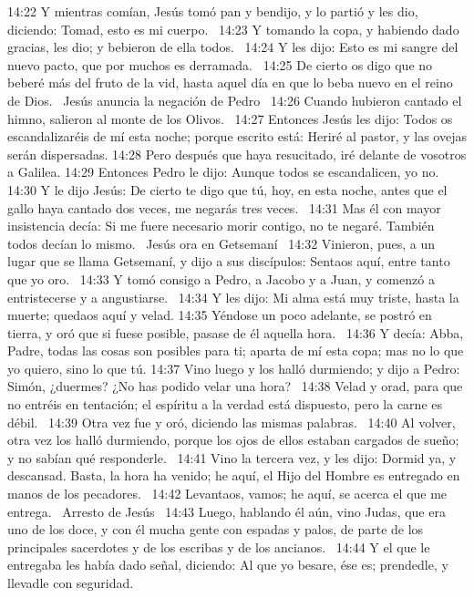 14:22 Y mientras comían, Jesús tomó pan y bendijo, y lo partió y les dio, diciendo: Tomad, esto es mi cuerpo.  
14:23 Y tomando la copa, y habiendo dado gracias, les dio; y bebieron de ella todos.  
14:24 Y les dijo: Esto es mi sangre del nuevo pacto, que por muchos es derramada.  
14:25 De cierto os digo que no beberé más del fruto de la vid, hasta aquel día en que lo beba nuevo en el reino de Dios.  
Jesús anuncia la negación de Pedro   
14:26 Cuando hubieron cantado el himno, salieron al monte de los Olivos.  
14:27 Entonces Jesús les dijo: Todos os escandalizaréis de mí esta noche; porque escrito está: Heriré al pastor, y las ovejas serán dispersadas. 
14:28 Pero después que haya resucitado, iré delante de vosotros a Galilea. 
14:29 Entonces Pedro le dijo: Aunque todos se escandalicen, yo no.  
14:30 Y le dijo Jesús: De cierto te digo que tú, hoy, en esta noche, antes que el gallo haya cantado dos veces, me negarás tres veces.  
14:31 Mas él con mayor insistencia decía: Si me fuere necesario morir contigo, no te negaré. También todos decían lo mismo.  
Jesús ora en Getsemaní   
14:32 Vinieron, pues, a un lugar que se llama Getsemaní, y dijo a sus discípulos: Sentaos aquí, entre tanto que yo oro.  
14:33 Y tomó consigo a Pedro, a Jacobo y a Juan, y comenzó a entristecerse y a angustiarse.  
14:34 Y les dijo: Mi alma está muy triste, hasta la muerte; quedaos aquí y velad. 
14:35 Yéndose un poco adelante, se postró en tierra, y oró que si fuese posible, pasase de él aquella hora.  
14:36 Y decía: Abba, Padre, todas las cosas son posibles para ti; aparta de mí esta copa; mas no lo que yo quiero, sino lo que tú. 
14:37 Vino luego y los halló durmiendo; y dijo a Pedro: Simón, ¿duermes? ¿No has podido velar una hora?  
14:38 Velad y orad, para que no entréis en tentación; el espíritu a la verdad está dispuesto, pero la carne es débil.  
14:39 Otra vez fue y oró, diciendo las mismas palabras.  
14:40 Al volver, otra vez los halló durmiendo, porque los ojos de ellos estaban cargados de sueño; y no sabían qué responderle.  
14:41 Vino la tercera vez, y les dijo: Dormid ya, y descansad. Basta, la hora ha venido; he aquí, el Hijo del Hombre es entregado en manos de los pecadores.  
14:42 Levantaos, vamos; he aquí, se acerca el que me entrega.  
Arresto de Jesús   
14:43 Luego, hablando él aún, vino Judas, que era uno de los doce, y con él mucha gente con espadas y palos, de parte de los principales sacerdotes y de los escribas y de los ancianos.  
14:44 Y el que le entregaba les había dado señal, diciendo: Al que yo besare, ése es; prendedle, y llevadle con seguridad.  
